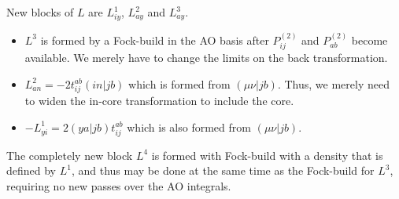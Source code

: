 \documentclass[fleqn,12pt]{article}
\newcommand{\tijab}{{t_{ij}^{ab}}}
\newcommand{\Ptwo}{P^{(2)}}
\begin{document}
New blocks of $L$ are $L^1_{iy}$, $L^2_{ay}$ and $L^3_{ay}$.  
\begin{itemize}
\item $L^3$ is formed by a Fock-build in the AO basis after
  $\Ptwo_{ij}$ and $\Ptwo_{ab}$ become available.  We merely have
  to change the limits on the back transformation.
\item $L^2_{an} = -2 \tijab (in|jb)$ which is formed from $(\mu \nu |
  jb)$.  Thus, we merely need to widen the in-core transformation to
  include the core.
\item $-L^1_{yi} = 2 (ya|jb) \tijab$ which is also formed from 
  $(\mu \nu | jb)$.  
\end{itemize}
The completely new block $L^4$ is formed with Fock-build with a
density that is defined by $L^1$, and thus may be done at the same
time as the Fock-build for $L^3$, requiring no new passes over the AO
integrals. 
\end{document}
